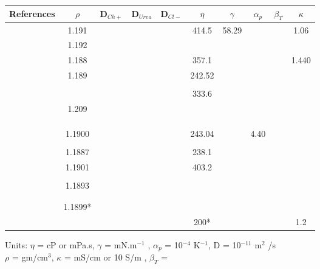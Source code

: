 \documentclass[11pt]{article}
\begin{document}
     \clearpage
     \clearpage
     \thispagestyle{empty}
     \begin{landscape}
          \centering
          \begin{tabular}{|c|c|c|c|c|c|c|c|c|c|}\hline
            References & $\rho$ & D$_{Ch+}$ & D$_{Urea}$ & D$_{Cl-}$& $\eta$ & $\gamma$  & $\alpha_{p}$ & $\beta_{T}$ & $\kappa$   \\ \hline
          \cite{Lapena2020}&1.191 & & & & 414.5 &58.29 & & & 1.06  \\ \hline
          \cite{Gilmore2019}&1.192& & & & & & & & \\ \hline 
          \cite{Agieienko2019}& 1.188& & & & 357.1& & & & 1.440 \\ \hline
          \cite{Dhingra2019}&1.189 & & & &242.52 & & & & \\ \hline
          \cite{Komal2018}& & & & & & & & & \\ \hline
          \cite{Mirza2017}& & & & &333.6 & & & & \\ \hline
          \cite{Jabbar2017}& 1.209& & & & & & & & \\ \hline
          \cite{Dietz2017}& & & & & & & & & \\ \hline
          \cite{Mjalli2016_1}& & & & & & & & & \\ \hline
          \cite{Mjalli2016_2}& & & & & & & & & \\ \hline
          \cite{Chemat2016}&1.1900 & & & &243.04 & & 4.40 & & \\ \hline
          \cite{Mjalli2014}& & & & & & & & & \\ \hline
          \cite{Yadav2014}&1.1887 & & & &238.1 & & & & \\ \hline
          \cite{Xie2014}&1.1901 & & & &403.2 & & & &  \\ \hline
          \cite{Shah2014}& &  & &  & & & & & \\ \hline
          \cite{Leron2012_1}& 1.1893 & & & & & & & & \\ \hline
          \cite{Leron2012_2}& & & & & & & & & \\ \hline
          \cite{D'Agostino2011}& &  & & & & & & & \\ \hline
          \cite{Su2009}&1.1899* & & & & & & & & \\ \hline
          \cite{Abbott2003}& & & & & 200*& & & &1.2 \\ \hline
          \end{tabular}
          Units: $\eta$ = cP or mPa.s, $\gamma$ = mN.m$^{-1}$ , $\alpha_{p}$  = 10$^{-4}$ K$^{-1}$, D = 10$^{-11}$ m$^{2}$ /s\\
          $\rho$ = gm/cm$^{3}$, $\kappa$ = mS/cm or 10 S/m , $\beta_{T}$ = 
     \end{landscape}
     \clearpage
     
\end{document}
